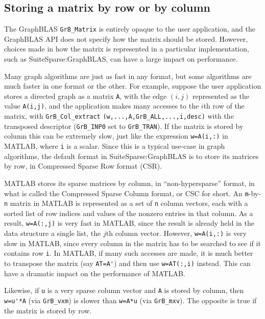 \documentclass[12pt]{article}
\begin{document}
\subsection{Storing a matrix by row or by column}

The GraphBLAS \verb'GrB_Matrix' is entirely opaque to the user application, and
the GraphBLAS API does not specify how the matrix should be stored.  However,
choices made in how the matrix is represented in a particular implementation,
such as SuiteSparse:GraphBLAS, can have a large impact on performance.

Many graph algorithms are just as fast in any format, but some algorithms are
much faster in one format or the other.  For example, suppose the user
application stores a directed graph as a matrix \verb'A', with the edge $(i,j)$
represented as the value \verb'A(i,j)', and the application makes many accesses
to the $i$th row of the matrix, with \verb'GrB_Col_extract'
\verb'(w,...,A,GrB_ALL,...,i,desc)' with the transposed descriptor
(\verb'GrB_INP0' set to \verb'GrB_TRAN').  If the matrix is stored by column
this can be extremely slow, just like the expression \verb'w=A(i,:)' in MATLAB,
where \verb'i' is a scalar.  Since this is a typical use-case in graph
algorithms, the default format in SuiteSparse:GraphBLAS is to store its
matrices by row, in Compressed Sparse Row format (CSR).

MATLAB stores its sparse matrices by column, in ``non-hypersparse'' format, in
what is called the Compressed Sparse Column format, or CSC for short.  An
\verb'm'-by-\verb'n' matrix in MATLAB is represented as a set of \verb'n'
column vectors, each with a sorted list of row indices and values of the
nonzero entries in that column.  As a result, \verb'w=A(:,j)' is very fast in
MATLAB, since the result is already held in the data structure a single list,
the $j$th column vector.  However, \verb'w=A(i,:)' is very slow in MATLAB,
since every column in the matrix has to be searched to see if it contains row
\verb'i'.  In MATLAB, if many such accesses are made, it is much better to
transpose the matrix (say \verb"AT=A'") and then use \verb"w=AT(:,i)" instead.
This can have a dramatic impact on the performance of MATLAB.

Likewise, if \verb'u' is a very sparse column vector and \verb'A' is stored by
column, then \verb"w=u'*A" (via \verb'GrB_vxm') is slower than \verb'w=A*u'
(via \verb'GrB_mxv').  The opposite is true if the matrix is stored by row.
\end{document}
